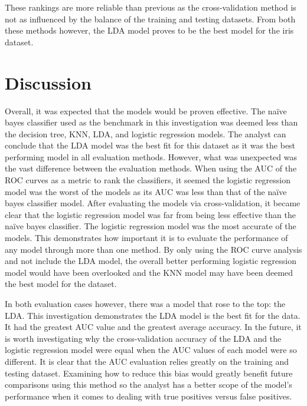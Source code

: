 \documentclass[journal]{IEEEtran}
\begin{document}
These rankings are more reliable than previous as the cross-validation method is not as influenced by the balance of the training and testing datasets. From both these methods however, the LDA model proves to be the best model for the iris dataset. 

\section{Discussion}
\label{sec:discussion}

Overall, it was expected that the models would be proven effective. The naïve bayes classifier used as the benchmark in this investigation was deemed less than the decision tree, KNN, LDA, and logistic regression models. The analyst can conclude that the LDA model was the best fit for this dataset as it was the best performing model in all evaluation methods. However, what was unexpected was the vast difference between the evaluation methods. When using the AUC of the ROC curves as a metric to rank the classifiers, it seemed the logistic regression model was the worst of the models as its AUC was less than that of the naïve bayes classifier model. After evaluating the models via cross-validation, it became clear that the logistic regression model was far from being less effective than the naïve bayes classifier. The logistic regression model was the most accurate of the models. This demonstrates how important it is to evaluate the performance of any model through more than one method. By only using the ROC curve analysis and not include the LDA model, the overall better performing logistic regression model would have been overlooked and the KNN model may have been deemed the best model for the dataset. 

In both evaluation cases however, there was a model that rose to the top: the LDA. This investigation demonstrates the LDA model is the best fit for the data. It had the greatest AUC value and the greatest average accuracy. In the future, it is worth investigating why the cross-validation accuracy of the LDA and the logistic regression model were equal when the AUC values of each model were so different. It is clear that the AUC evaluation relies greatly on the training and testing dataset. Examining how to reduce this bias would greatly benefit future comparisons using this method so the analyst has a better scope of the model's performance when it comes to dealing with true positives versus false positives. 
\end{document}
